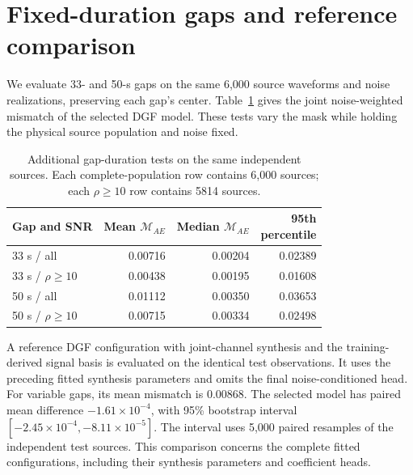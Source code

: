 \documentclass[10pt,prd,aps,a4paper,twocolumn,superscriptaddress,nofootinbib,floatfix]{revtex4-2}
\begin{document}
\section{Fixed-duration gaps and reference comparison}\label{app:fixed_gaps}
We evaluate 33- and 50-s gaps on the same 6,000 source waveforms and noise realizations, preserving each gap's center. Table~\ref{tab:fixed_gaps} gives the joint noise-weighted mismatch of the selected DGF model. These tests vary the mask while holding the physical source population and noise fixed.
\begin{table}[t]\centering\setlength{\tabcolsep}{2pt}
\caption{Additional gap-duration tests on the same independent sources. Each complete-population row contains 6,000 sources; each $\rho\ge10$ row contains 5814 sources.}\label{tab:fixed_gaps}
\begin{tabular}{lrrr}\hline\hline
Gap and SNR & Mean $\mathcal M_{AE}$ & Median $\mathcal M_{AE}$ & \shortstack{95th\\percentile}\\\hline
33 s / all & 0.00716 & 0.00204 & 0.02389\\
33 s / $\rho\ge10$ & 0.00438 & 0.00195 & 0.01608\\
50 s / all & 0.01112 & 0.00350 & 0.03653\\
50 s / $\rho\ge10$ & 0.00715 & 0.00334 & 0.02498\\
\hline\hline\end{tabular}\end{table}

A reference DGF configuration with joint-channel synthesis and the training-derived signal basis is evaluated on the identical test observations. It uses the preceding fitted synthesis parameters and omits the final noise-conditioned head. For variable gaps, its mean mismatch is 0.00868. The selected model has paired mean difference $-1.61\times10^{-4}$, with 95\% bootstrap interval $[-2.45\times10^{-4},-8.11\times10^{-5}]$. The interval uses 5,000 paired resamples of the independent test sources. This comparison concerns the complete fitted configurations, including their synthesis parameters and coefficient heads.

\clearpage

\end{document}

